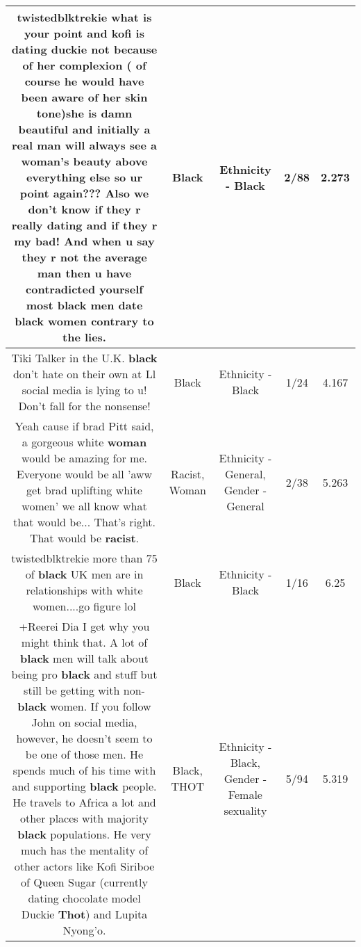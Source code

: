 \documentclass[11pt]{article}
\newlength\mylength
\begin{document}
\begin{center}
\begin{longtable}{|C{.65\mylength}|C{.30\mylength}|C{.12\mylength}|C{.12\mylength}|C{.12\mylength}|}
  \small twistedblktrekie what is your point and kofi is dating duckie not because of her complexion ( of course he would have been aware of her skin tone)she is damn beautiful and initially a real man will always see a woman's beauty above everything else so ur point again??? Also we don't know if they r really dating and if they r my bad! And when u say they r not the average man then u have contradicted yourself most \textbf{black} men date \textbf{black} women contrary to the lies.\normalsize   & Black & Ethnicity - Black & 2/88 & 2.273 \\  \hline
  \small Tiki Talker in the U.K. \textbf{black} don't hate on their own at Ll social media is lying to u! Don't fall for the nonsense!\normalsize   & Black & Ethnicity - Black & 1/24 & 4.167 \\  \hline
  \small Yeah cause if brad Pitt said, a gorgeous white \textbf{woman} would be amazing for me. Everyone would be all 'aww get brad uplifting white women' we all know what that would be... That's right. That would be \textbf{racist}.\normalsize   & Racist, Woman & Ethnicity - General, Gender - General & 2/38 & 5.263 \\  \hline
  \small twistedblktrekie more than 75 of \textbf{black} UK men are in relationships with white women....go figure lol\normalsize   & Black & Ethnicity - Black & 1/16 & 6.25 \\  \hline
  \small +Reerei Dia I get why you might think that.  A lot of \textbf{black} men will talk about being pro \textbf{black} and stuff but still be getting with non-\textbf{black} women.  If you follow John on social media, however, he doesn't seem to be one of those men.  He spends much of his time with and supporting \textbf{black} people.  He travels to Africa a lot and other places with majority \textbf{black} populations.  He very much has the mentality of other actors like Kofi Siriboe of Queen Sugar (currently dating chocolate model Duckie \textbf{Thot}) and Lupita Nyong'o.\normalsize   & Black, THOT & Ethnicity - Black, Gender - Female sexuality & 5/94 & 5.319 \\  \hline

\end{longtable}
\end{center}
\end{document}
